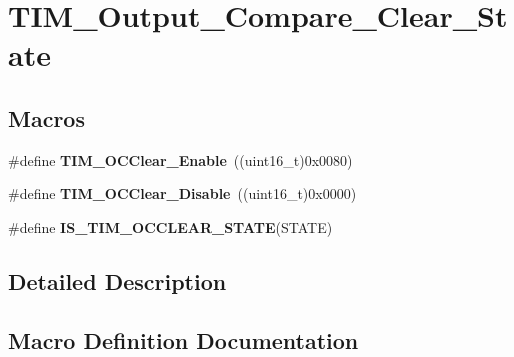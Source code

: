 \hypertarget{group___t_i_m___output___compare___clear___state}{}\section{T\+I\+M\+\_\+\+Output\+\_\+\+Compare\+\_\+\+Clear\+\_\+\+State}
\label{group___t_i_m___output___compare___clear___state}
\subsection*{Macros}
\begin{DoxyCompactItemize}
\item 
\#define {\bfseries T\+I\+M\+\_\+\+O\+C\+Clear\+\_\+\+Enable}~((uint16\+\_\+t)0x0080)\hypertarget{group___t_i_m___output___compare___clear___state_ga1b7bce48b3e1478aad98c95fbbe7a6e0}{}\label{group___t_i_m___output___compare___clear___state_ga1b7bce48b3e1478aad98c95fbbe7a6e0}

\item 
\#define {\bfseries T\+I\+M\+\_\+\+O\+C\+Clear\+\_\+\+Disable}~((uint16\+\_\+t)0x0000)\hypertarget{group___t_i_m___output___compare___clear___state_gadb09946cb5dded7520baf4b19173204d}{}\label{group___t_i_m___output___compare___clear___state_gadb09946cb5dded7520baf4b19173204d}

\item 
\#define {\bfseries I\+S\+\_\+\+T\+I\+M\+\_\+\+O\+C\+C\+L\+E\+A\+R\+\_\+\+S\+T\+A\+TE}(S\+T\+A\+TE)
\end{DoxyCompactItemize}


\subsection{Detailed Description}


\subsection{Macro Definition Documentation}
